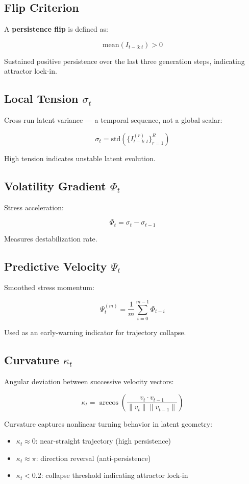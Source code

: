 \documentclass{article}
\begin{document}
\subsection{Flip Criterion}

A \textbf{persistence flip} is defined as:

$$\text{mean}(I_{t-3:t}) > 0$$

Sustained positive persistence over the last three generation steps, indicating attractor lock-in.

\subsection{Local Tension $\sigma_t$}

Cross-run latent variance — a temporal sequence, not a global scalar:

$$\sigma_t = \text{std}(\{I_{t-k:t}^{(r)}\}_{r=1}^{R})$$

High tension indicates unstable latent evolution.

\subsection{Volatility Gradient $\Phi_t$}

Stress acceleration:

$$\Phi_t = \sigma_t - \sigma_{t-1}$$

Measures destabilization rate.

\subsection{Predictive Velocity $\Psi_t$}

Smoothed stress momentum:

$$\Psi_t^{(m)} = \frac{1}{m} \sum_{i=0}^{m-1} \Phi_{t-i}$$

Used as an early-warning indicator for trajectory collapse.

\subsection{Curvature $\kappa_t$}

Angular deviation between successive velocity vectors:

$$\kappa_t = \arccos\left(\frac{v_t \cdot v_{t-1}}{\|v_t\| \|v_{t-1}\|}\right)$$

Curvature captures nonlinear turning behavior in latent geometry:
\begin{itemize}
    \item $\kappa_t \approx 0$: near-straight trajectory (high persistence)
    \item $\kappa_t \approx \pi$: direction reversal (anti-persistence)
    \item $\kappa_t < 0.2$: collapse threshold indicating attractor lock-in
\end{itemize}
\end{document}

